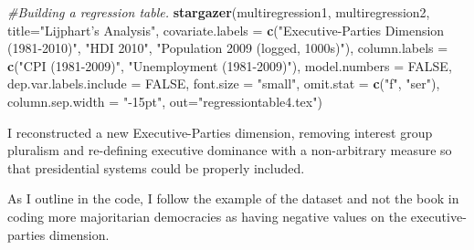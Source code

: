 \documentclass[11pt, oneside]{article}   	%
\newenvironment{Shaded}{\begin{snugshade}}{\end{snugshade}}
\newcommand{\CommentTok}[1]{\textcolor[rgb]{0.56,0.35,0.01}{\textit{#1}}}
\newcommand{\DataTypeTok}[1]{\textcolor[rgb]{0.13,0.29,0.53}{#1}}
\newcommand{\KeywordTok}[1]{\textcolor[rgb]{0.13,0.29,0.53}{\textbf{#1}}}
\newcommand{\NormalTok}[1]{#1}
\newcommand{\OtherTok}[1]{\textcolor[rgb]{0.56,0.35,0.01}{#1}}
\newcommand{\StringTok}[1]{\textcolor[rgb]{0.31,0.60,0.02}{#1}}
\begin{document}
\begin{Shaded}
\begin{Highlighting}[]
\CommentTok{#Building a regression table.}
\KeywordTok{stargazer}\NormalTok{(multiregression1, multiregression2, }
          \DataTypeTok{title=}\StringTok{"Lijphart's Analysis"}\NormalTok{, }
          \DataTypeTok{covariate.labels =} \KeywordTok{c}\NormalTok{(}\StringTok{"Executive-Parties Dimension (1981-2010)"}\NormalTok{, }\StringTok{"HDI 2010"}\NormalTok{, }
                               \StringTok{"Population 2009 (logged, 1000s)"}\NormalTok{), }
          \DataTypeTok{column.labels =} \KeywordTok{c}\NormalTok{(}\StringTok{"CPI (1981-2009)"}\NormalTok{, }\StringTok{"Unemployment (1981-2009)"}\NormalTok{), }
          \DataTypeTok{model.numbers =} \OtherTok{FALSE}\NormalTok{, }\DataTypeTok{dep.var.labels.include =} \OtherTok{FALSE}\NormalTok{, }
          \DataTypeTok{font.size =} \StringTok{"small"}\NormalTok{,}
          \DataTypeTok{omit.stat =} \KeywordTok{c}\NormalTok{(}\StringTok{"f"}\NormalTok{, }\StringTok{"ser"}\NormalTok{),}
          \DataTypeTok{column.sep.width =} \StringTok{"-15pt"}\NormalTok{, }\DataTypeTok{out=}\StringTok{"regressiontable4.tex"}\NormalTok{)}
\end{Highlighting}
\end{Shaded}

I reconstructed a new Executive-Parties dimension, removing interest
group pluralism and re-defining executive dominance with a non-arbitrary
measure so that presidential systems could be properly included.

As I outline in the code, I follow the example of the dataset and not
the book in coding more majoritarian democracies as having negative
values on the executive-parties dimension.
\end{document}
